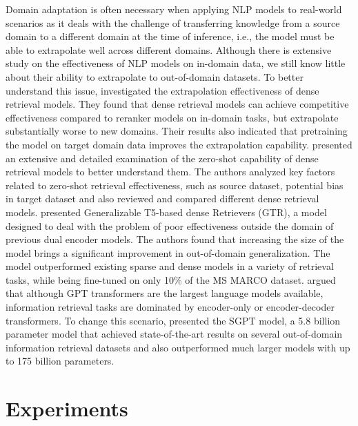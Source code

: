 \documentclass[sigconf,nonacm]{acmart}
\begin{document}
Domain adaptation is often necessary when applying NLP models to real-world scenarios as it deals with the challenge of transferring knowledge from a source domain to a different domain at the time of inference, i.e., the model must be able to extrapolate well across different domains. Although there is extensive study on the effectiveness of NLP models on in-domain data, we still know little about their ability to extrapolate to out-of-domain datasets. To better understand this issue, \citet{dense_2022} investigated the extrapolation effectiveness of dense retrieval models. They found that dense retrieval models can achieve competitive effectiveness compared to reranker models on in-domain tasks, but extrapolate substantially worse to new domains. Their results also indicated that pretraining the model on target domain data improves the extrapolation capability. \citet{dr_review} presented an extensive and detailed examination of the zero-shot capability of dense retrieval models to better understand them. The authors analyzed key factors related to zero-shot retrieval effectiveness, such as source dataset, potential bias in target dataset and also reviewed and compared different dense retrieval models. \citet{dual_2021} presented Generalizable T5-based dense Retrievers (GTR), a model designed to deal with the problem of poor effectiveness outside the domain of previous dual encoder models. The authors found that increasing the size of the model brings a significant improvement in out-of-domain generalization. The model outperformed existing sparse and dense models in a variety of retrieval tasks, while being fine-tuned on only 10\% of the MS MARCO dataset. \citet{SGPT} argued that although GPT transformers are the largest language models available, information retrieval tasks are dominated by encoder-only or encoder-decoder transformers. To change this scenario, \citet{SGPT} presented the SGPT model, a 5.8 billion parameter model that achieved state-of-the-art results on several out-of-domain information retrieval datasets and also outperformed much larger models with up to 175 billion parameters. 


\section{Experiments} 
\end{document}
